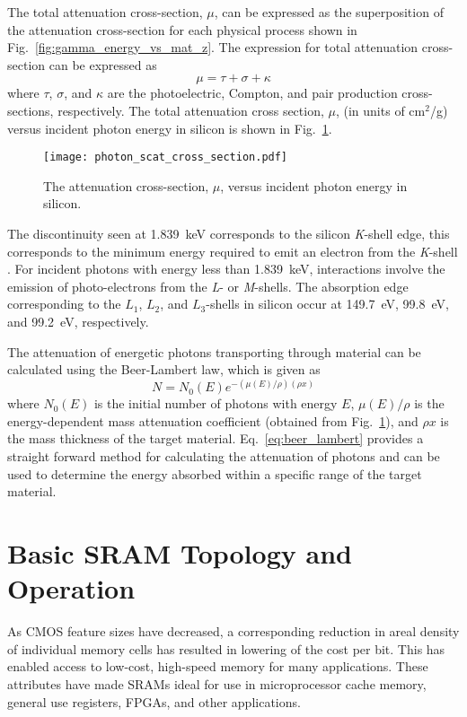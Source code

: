 The total attenuation cross-section, $\mu$, can be expressed as the superposition of the attenuation cross-section for each physical process shown in Fig.~\ref{fig:gamma_energy_vs_mat_z}.
The expression for total attenuation cross-section can be expressed as 
\begin{equation}
    \label{eq:total_photon_cs}
    \mu = \tau + \sigma + \kappa
\end{equation}
where $\tau$, $\sigma$, and $\kappa$ are the photoelectric, Compton, and pair production cross-sections, respectively.
The total attenuation cross section, $\mu$, (in units of cm$^2$/g) versus incident photon energy in silicon is shown in Fig.~\ref{fig:atten_cs_in_si}.
\begin{figure}[htbp]
    \begin{center}
        \texttt{[image: photon\_scat\_cross\_section.pdf]}
    \end{center}
    \caption{The attenuation cross-section, $\mu$, versus incident photon energy in silicon.}
    \label{fig:atten_cs_in_si}
\end{figure}
The discontinuity seen at 1.839~keV corresponds to the silicon \emph{K}-shell edge, this corresponds to the minimum energy required to emit an electron from the \emph{K}-shell \cite{Henke:1993tq}.
For incident photons with energy less than 1.839~keV, interactions involve the emission of photo-electrons from the \emph{L}- or \emph{M}-shells.
The absorption edge corresponding to the $L_1$, $L_2$, and $L_3$-shells in silicon occur at 149.7~eV, 99.8~eV, and 99.2~eV, respectively.

The attenuation of energetic photons transporting through material can be calculated using the Beer-Lambert law, which is given as
\begin{equation}
    \label{eq:beer_lambert}
    N = N_0(E) e^{-(\mu(E)/\rho) (\rho x)}
\end{equation}
where $N_0(E)$ is the initial number of photons with energy $E$, $\mu(E)/\rho$ is the energy-dependent mass attenuation coefficient (obtained from Fig.~\ref{fig:atten_cs_in_si}), and $\rho x$ is the mass thickness of the target material.
Eq.~\ref{eq:beer_lambert} provides a straight forward method for calculating the attenuation of photons and can be used to determine the energy absorbed within a specific range of the target material.

\section{Basic SRAM Topology and Operation} %
\label{sec:basic_sram_topology_and_operation}
As CMOS feature sizes have decreased, a corresponding reduction in areal density of individual memory cells has resulted in lowering of the cost per bit.
This has enabled access to low-cost, high-speed memory for many applications.
These attributes have made SRAMs ideal for use in microprocessor cache memory, general use registers, FPGAs, and other applications.

